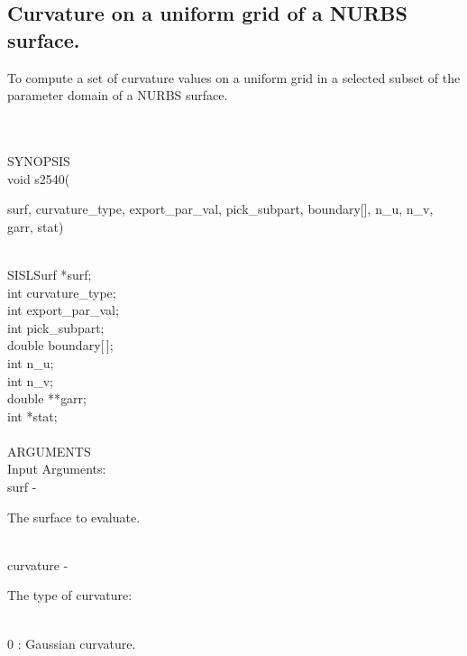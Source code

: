 \subsection{Curvature on a uniform grid of a NURBS surface.}
\begin{minipg1}
To compute a set of curvature values on a uniform grid 
            in a selected subset of the parameter domain of a NURBS surface.
\end{minipg1} \\ \\
SYNOPSIS\\
        \> void s2540(\begin{minipg3}
            {\fov surf}, {\fov curvature\_type},  {\fov export\_par\_val},  {\fov pick\_subpart}, boundary[],  {\fov n\_u},  {\fov n\_v}, 
       {\fov garr},  {\fov stat})
                \end{minipg3}\\
                \>\>    SISLSurf \> *{\fov surf};\\
                \>\>    int \> {\fov curvature\_type};\\
                \>\>    int \> {\fov export\_par\_val};\\
                \>\>    int \> {\fov pick\_subpart};\\
                \>\>    double \> {\fov boundary}[\,];\\
                \>\>    int \> {\fov n\_u};\\
                \>\>    int \> {\fov n\_v};\\
                \>\>    double \> **{\fov garr};\\
                \>\>    int \> *{\fov stat};\\
\\
ARGUMENTS\\
	\>Input Arguments:\\
        \>\>    {\fov surf}\> - \>  \begin{minipg2}
                     The surface to evaluate.
                               \end{minipg2}\\[0.8ex]
        \>\>    {\fov curvature}\> - \>  \begin{minipg2}
                     The type of curvature:
                               \end{minipg2}\\[0.8ex]
        \>\>\>\> $0$  \> : Gaussian curvature.\\
